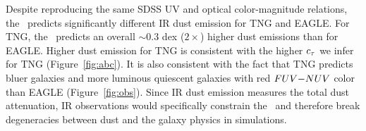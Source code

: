 Despite reproducing the same SDSS UV and optical color-magnitude relations, the
\eda~predicts significantly different IR dust emission for TNG and EAGLE. For
TNG, the \eda~predicts an overall ${\sim}0.3$ dex ($2\times$) higher dust
emissions than for EAGLE. Higher dust emission for TNG
is consistent with the higher $c_\tau$ we infer for TNG (Figure~\ref{fig:abc}).
It is also consistent with the fact that TNG predicts bluer galaxies and more
luminous quiescent galaxies with red $FUV{-}NUV$ color than EAGLE
(Figure~\ref{fig:obs}). Since IR dust emission measures the total dust
attenuation, IR observations would specifically constrain the \eda~and
therefore break degeneracies between dust and the galaxy physics in simulations.




